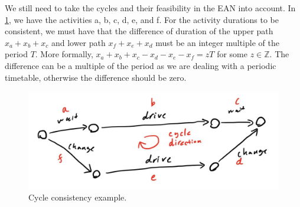 \documentclass[english, 12pt, a4paper, sci, utf8, a-2b, online]{aaltothesis}
\newcommand{\Z}{\mathbb{Z}}
\begin{document}
We still need to take the cycles and their feasibility in the EAN into account. In \cref{fig:cycle-example}, we have the activities a, b, c, d, e, and f. For the activity durations to be consistent, we must have that the difference of duration of the upper path $x_a + x_b + x_c$ and lower path $x_f + x_e + x_d$ must be an integer multiple of the period $T$. More formally, $x_a + x_b + x_c - x_d - x_e - x_f = zT$ for some $z\in \Z$. The difference can be a multiple of the period as we are dealing with a periodic timetable, otherwise the difference should be zero.

\begin{figure}
    \centering
    \includegraphics[width=\textwidth]{figures/cycle-basis-demo.jpg}
    \caption{Cycle consistency example.}
    \label{fig:cycle-example}
\end{figure}

        
        
%     
\end{document}
